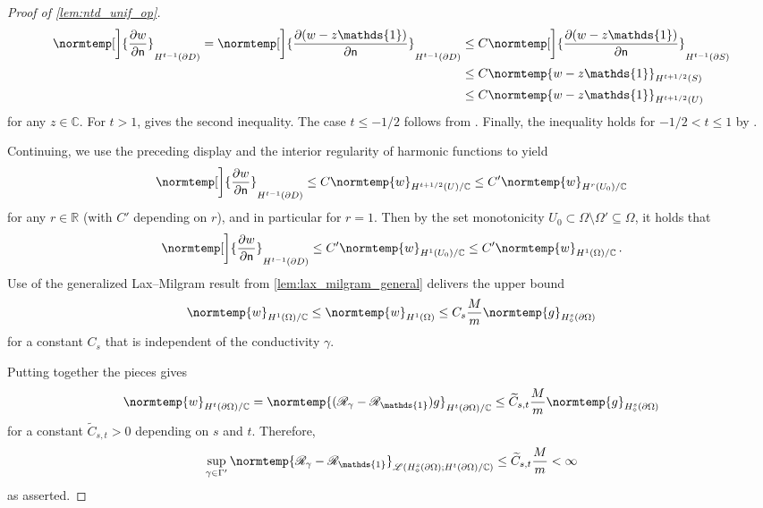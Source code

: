 \documentclass[pdflatex,sn-mathphys-num]{sn-jnl-preprint}
\newcommand{\R}{\mathbb{R}}
\newcommand{\C}{\mathbb{C}}
\newcommand{\sL}{\mathscr{L}}
\newcommand{\sR}{\mathscr{R}}
\newcommand{\ntd}{\mathscr{R}_{\gamma}}
\newcommand{\norm}{\normtemp}
\newcommand{\onebm}{\mathds{1}} %
\theoremstyle{thmstyleone}%
\theoremstyle{thmstyletwo}%
\theoremstyle{thmstylethree}%
\numberwithin{equation}{section}
\numberwithin{theorem}{section}
\begin{document}
\begin{appendices}
\begin{proof}[Proof of \cref{lem:ntd_unif_op}]
\begin{align*}
		\norm[\bigg]{\frac{\partial w}{\partial\mathsf{n}}}_{H^{t-1}(\partial D)} = \norm[\bigg]{\frac{\partial (w-z\onebm)}{\partial\mathsf{n}}}_{H^{t-1}(\partial D)}
		&\leq C \norm[\bigg]{\frac{\partial (w-z\onebm)}{\partial\mathsf{n}}}_{H^{t-1}(\partial S)}\\
		&\leq C \norm{w-z\onebm}_{H^{t+1/2}(S)}\\
		&\leq C \norm{w-z\onebm}_{H^{t+1/2}(U)}
	\end{align*}
	for any $z\in\C$. For $t>1$, \cite[Chp.~1, Thm.~9.4, pp.~41--42, taking $\mu=1$, $m=1$, and $s=t+1/2$]{lions2012non} gives the second inequality. The case $t\leq -1/2$ follows from \cite[Chp.~2, Thm.~6.5 and Remark 6.4, pp.~175--177, taking $m=1$, $m_0=1$, $r=-t-1/2$, and $A=-\Delta$]{lions2012non}. Finally, the inequality holds for $-1/2<t\leq 1$ by \cite[Chp.~2, Thm.~7.3, pp.~187--188, taking $m=1$, $m_0=1$, $0<s=t+1/2<2$, and $A=-\Delta$]{lions2012non}.
	
	Continuing, we use the preceding display and the interior regularity of harmonic functions \cite[Lemma~22, p.~197]{abraham2019statistical} to yield
	\begin{align*}
		\norm[\bigg]{\frac{\partial w}{\partial\mathsf{n}}}_{H^{t-1}(\partial D)}\leq C \norm{w}_{H^{t+1/2}(U)/\C}
		\leq C'\norm{w}_{H^r(U_0)/\C}
	\end{align*}
	for any $r\in\R$ (with $C'$ depending on $r$), and in particular for $r=1$. Then by the set monotonicity $U_0\subset \Omega\setminus \Omega'\subseteq \Omega$, it holds that
	\begin{align*}
		\norm[\bigg]{\frac{\partial w}{\partial\mathsf{n}}}_{H^{t-1}(\partial D)}\leq C'\norm{w}_{H^1(U_0)/\C}
		\leq C'\norm{w}_{H^1(\Omega)/\C}\,.
	\end{align*}
	Use of the generalized Lax--Milgram result from \cref{lem:lax_milgram_general} delivers the upper bound
	\begin{align*}
		\norm{w}_{H^1(\Omega)/\C}\leq \norm{w}_{H^1(\Omega)}\leq C_s\frac{M}{m}\norm{g}_{{H}_\diamond^s(\partial\Omega)}
	\end{align*}
	for a constant $C_s$ that is independent of the conductivity $\gamma$.
	
    Putting together the pieces gives
    \begin{align*}
        \norm{w}_{H^t(\partial \Omega)/\C} = \norm{(\ntd - \sR_{\onebm})g}_{H^t(\partial \Omega)/\C}\leq \widetilde{C}_{s,t}\frac{M}{m}\norm{g}_{H_{\diamond}^s(\partial\Omega)}
    \end{align*}
    for a constant $\widetilde{C}_{s,t}>0$ depending on $s$ and $t$. Therefore,
    \begin{align}\label{eqn:proof_uniform_shift_ntd}
        \sup_{\gamma\in\Gamma'}\norm{\ntd - \sR_{\onebm}}_{\sL({H}_\diamond^s(\partial\Omega);H^t(\partial\Omega)/\C)}\leq \widetilde{C}_{s,t}\frac{M}{m}<\infty
    \end{align}
    as asserted.
	

\end{proof}
\end{appendices}
\end{document}

